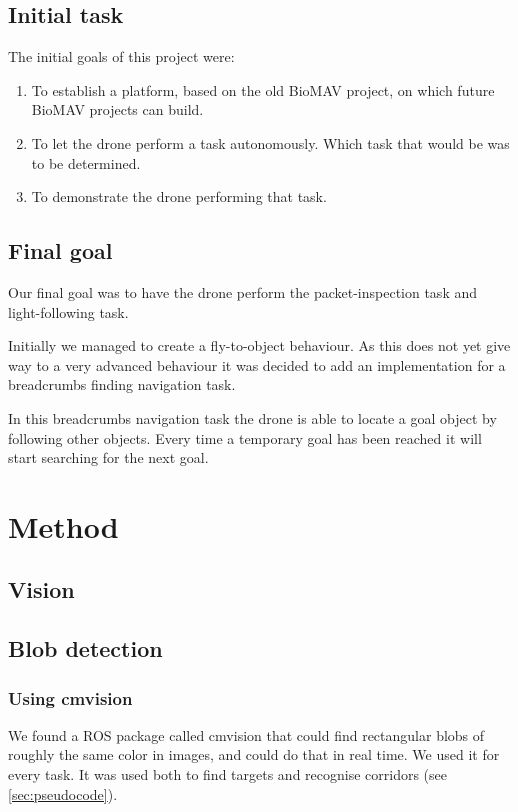 \documentclass[a4paper,10pt]{article}
\begin{document}
\subsection{Initial task}
\label{sec:initialtask}
The initial goals of this project were:
\begin{enumerate}
\item To establish a platform, based on the old BioMAV project, on which
      future BioMAV projects can build.
\item To let the drone perform a task autonomously. Which task that would be
      was to be determined.
\item To demonstrate the drone performing that task.
\end{enumerate}
\subsection{Final goal}
\label{sec:finalgoal}
Our final goal was to have the drone perform the packet-inspection task and
light-following task.

Initially we managed to create a fly-to-object behaviour. As this does not yet give way to a very advanced behaviour it was decided to add an implementation for a breadcrumbs finding navigation task. 

In this breadcrumbs navigation task the drone is able to locate a goal object by following other objects. 
Every time a temporary goal has been reached it will start searching for the next goal. 
\section{Method}
\subsection{Vision}


\subsection{Blob detection}
\subsubsection{Using cmvision}
We found a ROS package called cmvision that could find rectangular blobs of
roughly the same color in images, and could do that in real time. We used
it for every task. It was used both to find targets and recognise
corridors (see \ref{sec:pseudocode}).
\end{document}
